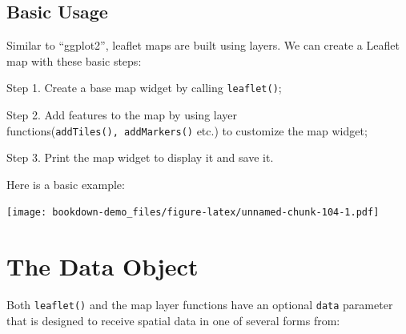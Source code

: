 \documentclass[]{book}
\newenvironment{Shaded}{\begin{snugshade}}{\end{snugshade}}
\newcommand{\KeywordTok}[1]{\textcolor[rgb]{0.13,0.29,0.53}{\textbf{#1}}}
\newcommand{\DataTypeTok}[1]{\textcolor[rgb]{0.13,0.29,0.53}{#1}}
\newcommand{\FloatTok}[1]{\textcolor[rgb]{0.00,0.00,0.81}{#1}}
\newcommand{\StringTok}[1]{\textcolor[rgb]{0.31,0.60,0.02}{#1}}
\newcommand{\CommentTok}[1]{\textcolor[rgb]{0.56,0.35,0.01}{\textit{#1}}}
\newcommand{\OperatorTok}[1]{\textcolor[rgb]{0.81,0.36,0.00}{\textbf{#1}}}
\newcommand{\NormalTok}[1]{#1}
\begin{document}
\subsection{Basic Usage}\label{basic-usage}

Similar to ``ggplot2'', leaflet maps are built using layers. We can
create a Leaflet map with these basic steps:

Step 1. Create a base map widget by calling \texttt{leaflet()};

Step 2. Add features to the map by using layer
functions(\texttt{addTiles(),\ addMarkers()} etc.) to customize the map
widget;

Step 3. Print the map widget to display it and save it.

Here is a basic example:

\begin{Shaded}
\end{Shaded}

\texttt{[image: bookdown-demo\_files/figure-latex/unnamed-chunk-104-1.pdf]}

\section{The Data Object}\label{the-data-object}

Both \texttt{leaflet()} and the map layer functions have an optional
\texttt{data} parameter that is designed to receive spatial data in one
of several forms from:
\end{document}
